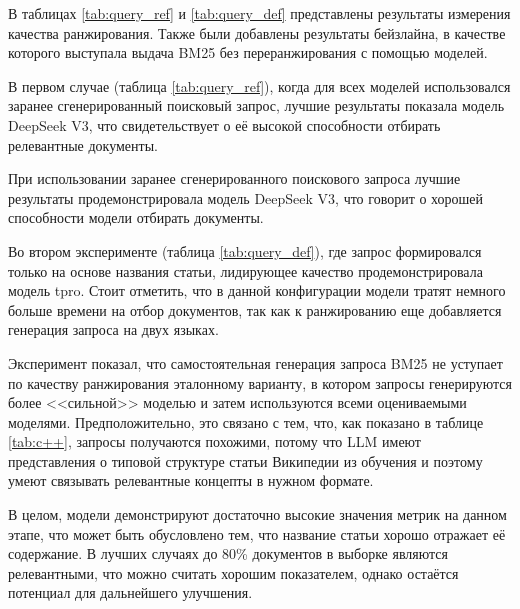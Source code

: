 \documentclass{article}
\theoremstyle{definition}
\theoremstyle{plain}
\begin{document}
В таблицах \ref{tab:query_ref} и \ref{tab:query_def} представлены результаты измерения качества ранжирования. 
Также были добавлены результаты бейзлайна, в качестве которого выступала выдача BM25 без переранжирования с помощью моделей. 

В первом случае (таблица \ref{tab:query_ref}), когда для всех моделей использовался заранее сгенерированный поисковый запрос, 
лучшие результаты показала модель DeepSeek V3, что свидетельствует о её высокой способности отбирать релевантные документы.

При использовании заранее сгенерированного поискового запроса лучшие результаты продемонстрировала модель DeepSeek V3, что говорит о хорошей способности модели отбирать документы.

Во втором эксперименте (таблица \ref{tab:query_def}), где запрос формировался только на основе названия статьи, лидирующее качество продемонстрировала модель tpro. 
Стоит отметить, что в данной конфигурации модели тратят немного больше времени на отбор документов, так как к ранжированию еще добавляется генерация запроса на двух языках.

Эксперимент показал, что самостоятельная генерация запроса BM25 не уступает по качеству ранжирования эталонному варианту, в котором запросы генерируются более <<сильной>> моделью и затем
используются всеми оцениваемыми моделями. Предположительно, это связано с тем, что, как показано в таблице \ref{tab:c++}, запросы получаются похожими, потому что
LLM имеют представления о типовой структуре статьи Википедии из обучения и поэтому умеют связывать релевантные концепты в нужном формате.

В целом, модели демонстрируют достаточно высокие значения метрик на данном этапе, что может быть обусловлено тем, что название статьи хорошо отражает её содержание. 
В лучших случаях до 80\% документов в выборке являются релевантными, что можно считать хорошим показателем, однако остаётся потенциал для дальнейшего улучшения.
\end{document}

